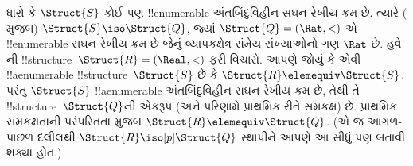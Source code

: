 \documentclass[../../../include/open-logic-section]{subfiles}
\begin{document}
\begin{rem}
  ધારો કે $\Struct{S}$ કોઈ પણ !!{enumerable} અંતબિંદુવિહીન સઘન રેખીય
  ક્રમ છે. ત્યારે ( મુજબ) $\Struct{S} \iso
  \Struct{Q}$, જ્યાં $\Struct{Q} = (\Rat, <)$ એ !!{enumerable} સઘન
  રેખીય ક્રમ છે જેનું વ્યાપકક્ષેત્ર સંમેય સંખ્યાઓનો ગણ $\Rat$ છે. હવે
  ની !!{structure}~$\Struct{R} = (\Real, <)$ ફરી
  વિચારો. આપણે જોયું કે એવી !!a{enumerable} !!{structure}~$\Struct{S}$
  છે કે $\Struct{R} \elemequiv \Struct{S}$. પરંતુ $\Struct{S}$
  !!a{enumerable} અંતબિંદુવિહીન સઘન રેખીય ક્રમ છે, તેથી તે
  !!{structure}~$\Struct{Q}$ની એકરૂપ (અને પરિણામે પ્રાથમિક રીતે સમકક્ષ)
  છે. પ્રાથમિક સમકક્ષતાની પરંપરિતતા મુજબ $\Struct{R} \elemequiv
  \Struct{Q}$. (એ જ આગળ-પાછળ દલીલથી $\Struct{R} \iso[p]
  \Struct{Q}$ સ્થાપીને આપણે આ સીધું પણ બતાવી શક્યા હોત.)
\end{rem}
\end{document}
